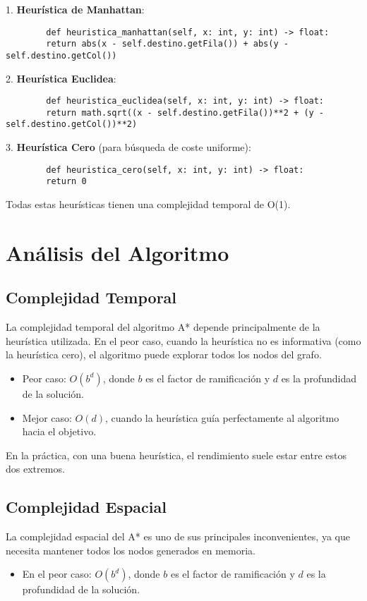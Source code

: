 \documentclass[a4paper,12pt]{article}
\begin{document}
	1. \textbf{Heurística de Manhattan}:
	\begin{verbatim}
		def heuristica_manhattan(self, x: int, y: int) -> float:
		return abs(x - self.destino.getFila()) + abs(y - self.destino.getCol())
	\end{verbatim}
	
	2. \textbf{Heurística Euclidea}:
	\begin{verbatim}
		def heuristica_euclidea(self, x: int, y: int) -> float:
		return math.sqrt((x - self.destino.getFila())**2 + (y - self.destino.getCol())**2)
	\end{verbatim}
	
	3. \textbf{Heurística Cero} (para búsqueda de coste uniforme):
	\begin{verbatim}
		def heuristica_cero(self, x: int, y: int) -> float:
		return 0
	\end{verbatim}
	
	Todas estas heurísticas tienen una complejidad temporal de O(1).
	
	\section{Análisis del Algoritmo}
	
	\subsection{Complejidad Temporal}
	La complejidad temporal del algoritmo A* depende principalmente de la heurística utilizada. En el peor caso, cuando la heurística no es informativa (como la heurística cero), el algoritmo puede explorar todos los nodos del grafo.
		\begin{itemize}
			\item Peor caso: \( O(b^{d}) \), donde \( b \) es el factor de ramificación y \( d \) es la profundidad de la solución.
			\item Mejor caso: \( O(d) \), cuando la heurística guía perfectamente al algoritmo hacia el objetivo.
		\end{itemize}

	En la práctica, con una buena heurística, el rendimiento suele estar entre estos dos extremos.
	
	\subsection{Complejidad Espacial}
	La complejidad espacial del A* es uno de sus principales inconvenientes, ya que necesita mantener todos los nodos generados en memoria.
	\begin{itemize}
		\item En el peor caso: \( O(b^d) \), donde \( b \) es el factor de ramificación y \( d \) es la profundidad de la solución.
	\end{itemize}
\end{document}
